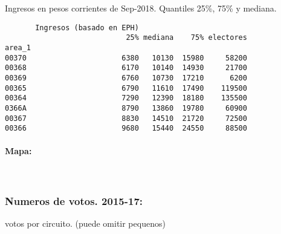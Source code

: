 \documentclass[11pt]{article}
\begin{document}
    
    Ingresos en pesos corrientes de Sep-2018. Quantiles 25\%, 75\% y
mediana.

    
    
    \begin{verbatim}
       Ingresos (basado en EPH)                         
                            25% mediana    75% electores
area_1                                                  
00370                      6380   10130  15980     58200
00368                      6170   10140  14930     21700
00369                      6760   10730  17210      6200
00365                      6790   11610  17490    119500
00364                      7290   12390  18180    135500
0366A                      8790   13860  19780     60900
00367                      8830   14510  21720     72500
00366                      9680   15440  24550     88500
    \end{verbatim}

    
    \hypertarget{mapa}{%
\paragraph{Mapa:}\label{mapa}}

    
    \begin{center}
    \end{center}
    { \hspace*{\fill} \\}
    
    \hypertarget{numeros-de-votos.-2015-17}{%
\subsubsection{Numeros de votos.
2015-17:}\label{numeros-de-votos.-2015-17}}

    
    votos por circuito. (puede omitir pequenos)

    
    
\end{document}
